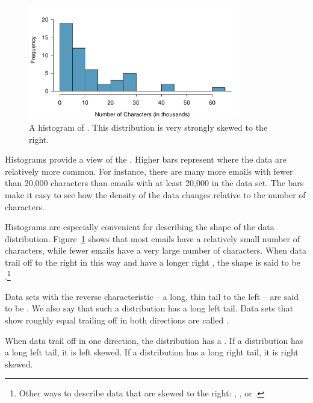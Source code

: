 \begin{figure}[bth]
   \centering
   \includegraphics[width=0.82\textwidth]{ch_intro_to_data/figures/email50NumCharHist/email50NumCharHist}
   \caption{A histogram of . This distribution is very strongly skewed to the right.}
   \label{email50NumCharHist}
\end{figure}

Histograms provide a view of the . Higher bars represent where the data are relatively more common. For instance, there are many more emails with fewer than 20,000 characters than emails with at least 20,000 in the data set. The bars make it easy to see how the density of the data changes relative to the number of characters.

Histograms are especially convenient for describing the shape of the data distribution\label{shapeFirstDiscussed}. Figure~\ref{email50NumCharHist} shows that most emails have a relatively small number of characters, while fewer emails have a very large number of characters. When data trail off to the right in this way and have a longer right , the shape is said to be .\footnote{Other ways to describe data that are skewed to the right: , , or .}

Data sets with the reverse characteristic -- a long, thin tail to the left -- are said to be . We also say that such a distribution has a long left tail. Data sets that show roughly equal trailing off in both directions are called .

\begin{termBox}{%
When data trail off in one direction, the distribution has a .  If a distribution has a long left tail, it is left skewed. If a distribution has a long right tail, it is right skewed.}
\end{termBox}

